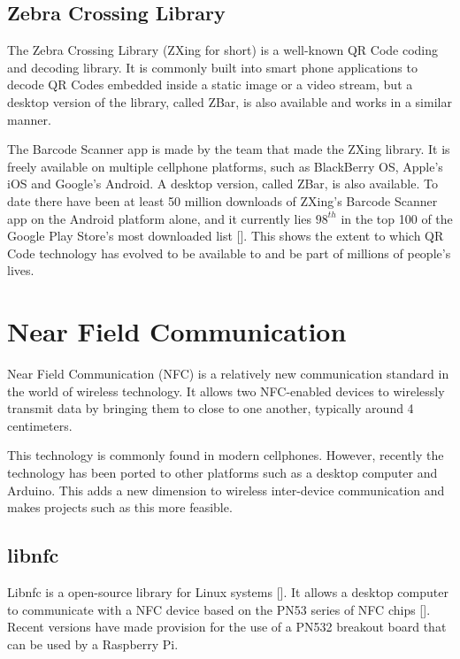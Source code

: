\subsection{Zebra Crossing Library}
\label{sec:zbar}

The Zebra Crossing Library (ZXing for short) is a well-known QR Code coding and decoding
library. It is commonly built into smart phone applications to decode QR Codes embedded inside
a static image or a video stream, but a desktop version of the library, called ZBar, is also
available and works in a similar manner. 

The Barcode Scanner app is made by the team that made the ZXing library. It is freely
available on multiple cellphone platforms, such as BlackBerry OS, Apple's iOS and Google's
Android. A desktop version, called ZBar, is also available.
To date there have been at least 50 million downloads of ZXing's Barcode Scanner app on the
Android platform alone, and it currently lies $98^{th}$ in the top 100 of the Google Play
Store's most downloaded list [\cite{website:barcodescanner}]. This shows the extent to which QR
Code technology has evolved to be available to and be part of millions of people's lives.

\section{Near Field Communication}

Near Field Communication (NFC) is a relatively new communication standard in the world of
wireless technology. It allows two NFC-enabled devices to wirelessly transmit data by bringing
them to close to one another, typically around 4 centimeters.

This technology is commonly found in modern cellphones. However, recently the technology has
been ported to other platforms such as a desktop computer and Arduino. This adds a new
dimension to wireless inter-device communication and makes projects such as this more
feasible.

\subsection{libnfc}

Libnfc is a open-source library for Linux systems [\cite{website:libnfc}]. It allows a
desktop computer to communicate with a NFC device based on the PN53 series of NFC chips
[\cite{website:libnfc-hardware}]. Recent versions have made provision for the use of a PN532
breakout board that can be used by a Raspberry Pi. 

